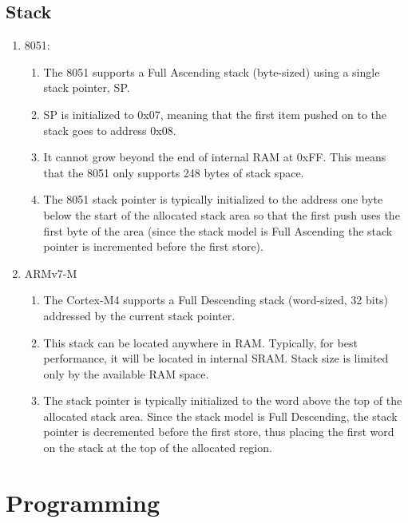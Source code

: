\documentclass{article}
\begin{document}
\subsection{Stack}\label{subsection:Stack}

\begin{enumerate}
  \item 8051:
  \begin{enumerate}
    \item The 8051 supports a Full Ascending stack (byte-sized) using a single stack pointer, SP. 
    \item SP is initialized to 0x07, meaning that the first item pushed on to the stack goes to address 0x08.
    \item It cannot grow beyond the end of internal RAM at 0xFF. This means that the 8051 only supports 248 bytes of stack space.
    \item The 8051 stack pointer is typically initialized to the address one byte below the start of the
    allocated stack area so that the first push uses the first byte of the area (since the stack
    model is Full Ascending the stack pointer is incremented before the first store).
    \end{enumerate}
  \item ARMv7-M
  \begin{enumerate}
          \item The Cortex-M4 supports a Full Descending stack (word-sized, 32 bits) addressed by the current stack pointer.
          \item This stack can be located anywhere in RAM. Typically, for best performance,
          it will be located in internal SRAM. Stack size is limited only by the available RAM space.
          \item The stack pointer is typically initialized to the word above the top of the
          allocated stack area. Since the stack model is Full Descending, the stack pointer is
          decremented before the first store, thus placing the first word on the stack at the top of the
          allocated region.
  \end{enumerate}
\end{enumerate}

\section{Programming}\label{section:Programming}
\end{document}
